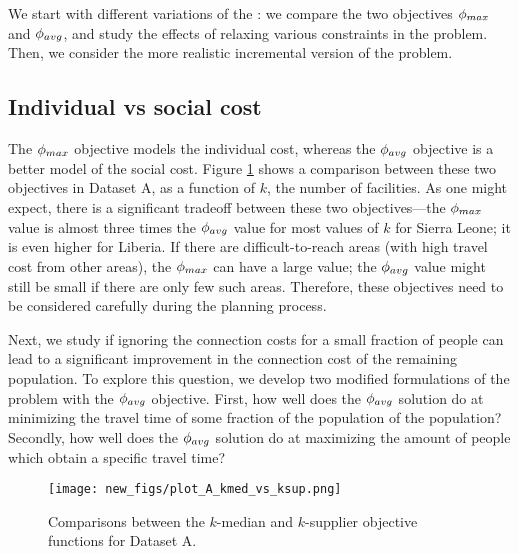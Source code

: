 
We start with different variations of the \probstatic{}: we compare the two objectives
$\phi_{max}$ and $\phi_{avg}$, and study the effects of relaxing various constraints in the problem.
Then, we consider the more realistic incremental version of the problem.

\subsection*{Individual vs social cost}
The $\phi_{max}$ objective models the individual cost, whereas the $\phi_{avg}$ objective
is a better model of the social cost. 
Figure \ref{fig:kmed_vs_ksup} shows a comparison between these two objectives in Dataset A, as a function of
$k$, the number of facilities.
As one might expect, there is a significant tradeoff between these two objectives---the $\phi_{max}$ value
is almost three times the $\phi_{avg}$ value for most values of $k$ for Sierra Leone; it is even higher for Liberia.
If there are difficult-to-reach areas (with high travel cost from other areas),
the $\phi_{max}$ can have a large value; the $\phi_{avg}$ value might still be small if there are only
few such areas.  Therefore, these objectives need to be considered carefully during the planning process.

Next, we study if ignoring the connection costs for a small fraction of people can lead to a
significant improvement in the connection cost of the remaining population.
To explore this question, we develop two modified formulations of the \probstatic{} problem with the
$\phi_{avg}$ objective.
First, how well does the $\phi_{avg}$ solution do at minimizing the travel time of some fraction of 
the population of the population? 
Secondly, how well does the $\phi_{avg}$ solution
do at maximizing the amount of people which obtain a specific travel time? 




\begin{figure}[h]
\centering
\texttt{[image: new\_figs/plot\_A\_kmed\_vs\_ksup.png]}
\caption{Comparisons between the $k$-median and $k$-supplier objective functions for Dataset A.}\label{fig:kmed_vs_ksup}
\end{figure}


